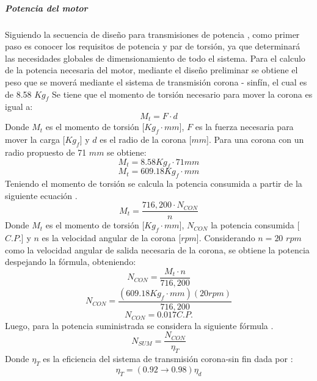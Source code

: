 \subparagraph{Potencia del motor}\hfill \break
Siguiendo la secuencia de diseño para transmisiones de potencia \cite{Shigley2012}, como primer paso es conocer los requisitos de potencia y par de torsión, ya que determinará las necesidades globales de dimensionamiento de todo el sistema.\hfill \break
Para el calculo de la potencia necesaria del motor, mediante el diseño preliminar se obtiene el peso que se moverá mediante el sistema de transmisión corona - sinfín, el cual es de 8.58 $Kg_f$\break
Se tiene que el momento de torsión \cite{Rodríguez2015} necesario para mover la corona es igual a:
\begin{equation}
    M_t = F\cdot d
\end{equation}
Donde $M_t$ es el momento de torsión [$Kg_f\cdot mm$], $F$ es la fuerza necesaria para mover la carga [$Kg_f$] y $d$ es el radio de la corona [$mm$].
Para una corona con un radio propuesto de 71 $mm$ se obtiene:
\begin{equation*}
    M_t = 8.58 Kg_f\cdot 71 mm
\end{equation*}
\begin{equation*}
    M_t = 609.18 Kg_f\cdot mm    
\end{equation*}
Teniendo el momento de torsión se calcula la potencia consumida a partir de la siguiente ecuación \cite{Rodríguez2015}.
\begin{equation}
    M_t = \frac{716,200\cdot N_{CON}}{n}
\end{equation}
Donde $M_t$ es el momento de torsión [$Kg_f\cdot mm$], $N_{CON}$ la potencia consumida [$C.P.$] y $n$ es la velocidad angular de la corona [$rpm$].
Considerando $n=20$ $rpm$ como la velocidad angular de salida necesaria de la corona, se obtiene la potencia despejando la fórmula, obteniendo:
\begin{equation*}
    N_{CON}=\frac{M_t\cdot n}{716,200}
\end{equation*}
\begin{equation*}
    N_{CON}=\frac{(609.18 Kg_f\cdot mm)(20rpm)}{716,200}
\end{equation*}
\begin{equation*}
    N_{CON}=0.017 C.P.
\end{equation*}
Luego, para la potencia suministrada se considera la siguiente fórmula \cite{Rodríguez2015}.
\begin{equation}\label{equ:PotenciaSUM}
    N_{SUM}=\frac{N_{CON}}{\eta_T}
\end{equation}
Donde $\eta_T$ es la eficiencia del sistema de transmisión corona-sin fin dada por \cite{Rodríguez2015}: 
\begin{equation}
    \eta_T=(0.92 \rightarrow 0.98)\eta_d
\end{equation}

